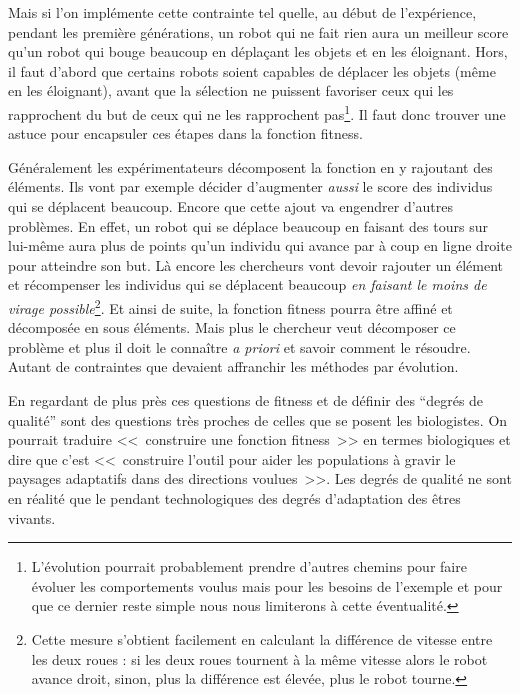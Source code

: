 Mais si l'on implémente cette contrainte tel quelle, au début de l'expérience, pendant les première générations, un robot qui ne fait rien aura un meilleur score qu'un robot qui bouge beaucoup en déplaçant les objets et en les éloignant. Hors, il faut d'abord que certains robots soient capables de déplacer les objets (même en les éloignant), avant que la sélection ne puissent favoriser ceux qui les rapprochent du but de ceux qui ne les rapprochent pas\footnote{L'évolution pourrait probablement prendre d'autres chemins pour faire évoluer les comportements voulus mais pour les besoins de l'exemple et pour que ce dernier reste simple nous nous limiterons à cette éventualité.}. Il faut donc trouver une astuce pour encapsuler ces étapes dans la fonction fitness. 

Généralement les expérimentateurs décomposent la fonction en y rajoutant des éléments. Ils vont par exemple décider d'augmenter \emph{aussi} le score des individus qui se déplacent beaucoup. Encore que cette ajout va engendrer d'autres problèmes. En effet, un robot qui se déplace beaucoup en faisant des tours sur lui-même aura plus de points qu'un individu qui avance par à coup en ligne droite pour atteindre son but. Là encore les chercheurs vont devoir rajouter un élément et récompenser les individus qui se déplacent beaucoup \emph{en faisant le moins de virage possible}\footnote{Cette mesure s'obtient facilement en calculant la différence de vitesse entre les deux roues : si les deux roues tournent à la même vitesse alors le robot avance droit, sinon, plus la différence est élevée, plus le robot tourne.}. Et ainsi de suite, la fonction fitness pourra être affiné et décomposée en sous éléments. Mais plus le chercheur veut décomposer ce problème et plus il doit le connaître \emph{a priori} et savoir comment le résoudre. Autant de contraintes que devaient affranchir les méthodes par évolution. 

En regardant de plus près ces questions de fitness et de définir des ``degrés de qualité'' sont des questions très proches de celles que se posent les biologistes.
On pourrait traduire <<~construire une fonction fitness~>> en termes biologiques et dire que c'est <<~construire l'outil pour aider les populations à gravir le paysages adaptatifs dans des directions voulues~>>. Les degrés de qualité ne sont en réalité que le pendant technologiques des degrés d'adaptation des êtres vivants. 

